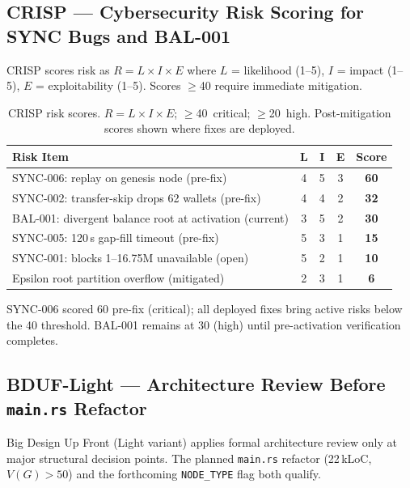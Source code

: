 \documentclass[12pt,a4paper]{article}
\begin{document}
\subsection{CRISP --- Cybersecurity Risk Scoring for SYNC Bugs and BAL-001}

CRISP scores risk as $R = L \times I \times E$ where $L$ = likelihood (1--5),
$I$ = impact (1--5), $E$ = exploitability (1--5). Scores $\geq$40 require
immediate mitigation.

\begin{table}[H]
\centering
\small
\begin{tabularx}{\linewidth}{Xcccc}
\toprule
\textbf{Risk Item} & \textbf{L} & \textbf{I} & \textbf{E} & \textbf{Score} \\
\midrule
SYNC-006: replay on genesis node (pre-fix) &
  4 & 5 & 3 & \textcolor{qred}{\bfseries 60} \\
\rowcolor{rowgray}
SYNC-002: transfer-skip drops 62 wallets (pre-fix) &
  4 & 4 & 2 & \textcolor{qred}{\bfseries 32} \\
BAL-001: divergent balance root at activation (current) &
  3 & 5 & 2 & \textcolor{qorange}{\bfseries 30} \\
\rowcolor{rowgray}
SYNC-005: 120\,s gap-fill timeout (pre-fix) &
  5 & 3 & 1 & \textcolor{qorange}{\bfseries 15} \\
SYNC-001: blocks 1--16.75M unavailable (open) &
  5 & 2 & 1 & \textcolor{qorange}{\bfseries 10} \\
\rowcolor{rowgray}
Epsilon root partition overflow (mitigated) &
  2 & 3 & 1 & \textcolor{qgreen}{\bfseries 6} \\
\bottomrule
\end{tabularx}
\caption{CRISP risk scores. $R = L \times I \times E$;
  $\geq$40~critical; $\geq$20~high. Post-mitigation scores shown where fixes are deployed.}
\end{table}

SYNC-006 scored 60 pre-fix (critical); all deployed fixes bring active risks
below the 40 threshold. BAL-001 remains at 30 (high) until pre-activation
verification completes.

\subsection{BDUF-Light --- Architecture Review Before \texttt{main.rs} Refactor}

Big Design Up Front (Light variant) applies formal architecture review only at
major structural decision points. The planned \texttt{main.rs} refactor
(22\,kLoC, $V(G)>50$) and the forthcoming \texttt{NODE\_TYPE} flag both qualify.
\end{document}
